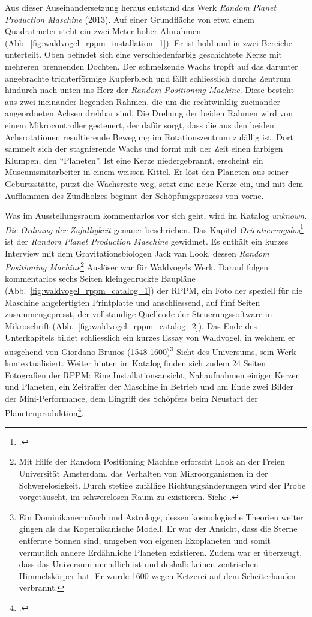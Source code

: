 \documentclass[
paper=164mm:234mm, %
pagesize, %
DIV=calc, %
10pt, %
parskip=half- %
]{scrbook}
\begin{document}
Aus dieser Auseinandersetzung heraus entstand das Werk \emph{Random Planet Production Maschine} (2013). Auf einer Grundfläche von etwa einem Quadratmeter steht ein zwei Meter hoher Alurahmen (Abb.~\ref{fig:waldvogel_rppm_installation_1}). Er ist hohl und in zwei Bereiche unterteilt. Oben befindet sich eine verschiedenfarbig geschichtete Kerze mit mehreren brennenden Dochten. Der schmelzende Wachs tropft auf das darunter angebrachte trichterförmige Kupferblech und fällt schliesslich durchs Zentrum hindurch nach unten ins Herz der \emph{Random Positioning Machine}. Diese besteht aus zwei ineinander liegenden Rahmen, die um die rechtwinklig zueinander angeordneten Achsen drehbar sind. Die Drehung der beiden Rahmen wird von einem Mikrocontroller gesteuert, der dafür sorgt, dass die aus den beiden Achsrotationen resultierende Bewegung im Rotationszentrum zufällig ist. Dort sammelt sich der stagnierende Wachs und formt mit der Zeit einen farbigen Klumpen, den \enquote{Planeten}. Ist eine Kerze niedergebrannt, erscheint ein Museumsmitarbeiter in einem weissen Kittel. Er löst den Planeten aus seiner Geburtsstätte, putzt die Wachsreste weg, setzt eine neue Kerze ein, und mit dem Aufflammen des Zündholzes beginnt der Schöpfungsprozess von vorne.

Was im Ausstellungsraum kommentarlos vor sich geht, wird im Katalog \emph{unknown. Die Ordnung der Zufälligkeit} genauer beschrieben. Das Kapitel \emph{Orientierungslos}\footnote{\cite[13-36]{Waldvogel:2014}.} ist der \emph{Random Planet Production Maschine} gewidmet. Es enthält ein kurzes Interview mit dem Gravitationsbiologen Jack van Look, dessen \emph{Random Positioning Machine}\footnote{Mit Hilfe der Random Positioning Machine erforscht Look an der Freien Universität Amsterdam, das Verhalten von Mikroorganismen in der Schwerelosigkeit. Durch stetige zufällige Richtungsänderungen wird der Probe vorgetäuscht, im schwerelosen Raum zu existieren. Siehe \cite[15]{Waldvogel:2014}.} Auslöser war für Waldvogels Werk. Darauf folgen kommentarlos sechs Seiten kleingedruckte Baupläne (Abb.~\ref{fig:waldvogel_rppm_catalog_1}) der RPPM, ein Foto der speziell für die Maschine angefertigten Printplatte und anschliessend, auf fünf Seiten zusammengepresst, der vollständige Quellcode der Steuerungssoftware in Mikroschrift (Abb.~\ref{fig:waldvogel_rppm_catalog_2}). Das Ende des Unterkapitels bildet schliesslich ein kurzes Essay von Waldvogel, in welchem er ausgehend von Giordano Brunos (1548-1600)\footnote{Ein Dominikanermönch und Astrologe, dessen kosmologische Theorien weiter gingen als das Kopernikanische Modell. Er war der Ansicht, dass die Sterne entfernte Sonnen sind, umgeben von eigenen Exoplaneten und somit vermutlich andere Erdähnliche Planeten existieren. Zudem war er überzeugt, dass das Universum unendlich ist und deshalb keinen zentrischen Himmelskörper hat. Er wurde 1600 wegen Ketzerei auf dem Scheiterhaufen verbrannt.} Sicht des Universums, sein Werk kontextualisiert. Weiter hinten im Katalog finden sich zudem 24 Seiten Fotografien der RPPM: Eine Installationsansicht, Nahaufnahmen einiger Kerzen und Planeten, ein Zeitraffer der Maschine in Betrieb und am Ende zwei Bilder der Mini-Performance, dem Eingriff des Schöpfers beim Neustart der Planetenproduktion\footnote{\cite[112-135]{Waldvogel:2014}.}.
\end{document}
